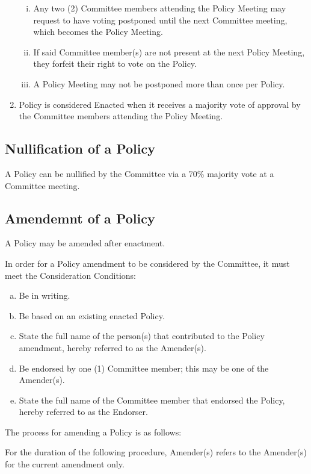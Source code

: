 \documentclass[a4paper,12pt]{article}
\begin{document}
\begin{enumerate}[1)]
    \begin{enumerate}[i)]
        \item Any two (2) Committee members attending the Policy Meeting may request to have voting postponed until the next Committee meeting, which becomes the Policy Meeting.
        \item If said Committee member(s) are not present at the next Policy Meeting, they forfeit their right to vote on the Policy.
        \item A Policy Meeting may not be postponed more than once per Policy.
    \end{enumerate}
    \item Policy is considered Enacted when it receives a majority vote of approval by the Committee members attending the Policy Meeting.
\end{enumerate}

\subsection{Nullification of a Policy}
A Policy can be nullified by the Committee via a 70\% majority vote at a Committee meeting.

\subsection{Amendemnt of a Policy}
A Policy may be amended after enactment.

In order for a Policy amendment to be considered by the Committee, it must meet the Consideration Conditions:

\begin{enumerate}[a)]
    \item Be in writing.
    \item Be based on an existing enacted Policy.
    \item State the full name of the person(s) that contributed to the Policy amendment, hereby referred to as the Amender(s).
    \item Be endorsed by one (1) Committee member; this may be one of the Amender(s).
    \item State the full name of the Committee member that endorsed the Policy, hereby referred to as the Endorser.    
\end{enumerate}

The process for amending a Policy is as follows:

For the duration of the following procedure, Amender(s) refers to the Amender(s) for the current amendment only.
\end{document}
